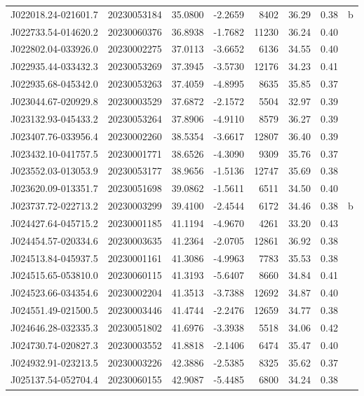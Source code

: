 \documentclass{article}
\begin{document}
\begin {longtable}{|l|l|r|r|r|r|r|l|}
 J022018.24-021601.7&  20230053184&   35.0800&   -2.2659&  8402& 36.29& 0.38&b\\%
 J022733.54-014620.2&  20230060376&   36.8938&   -1.7682& 11230& 36.24& 0.40&\\
 J022802.04-033926.0&  20230002275&   37.0113&   -3.6652&  6136& 34.55& 0.40&\\
 J022935.44-033432.3&  20230053269&   37.3945&   -3.5730& 12176& 34.23& 0.41&\\
 J022935.68-045342.0&  20230053263&   37.4059&   -4.8995&  8635& 35.85& 0.37&\\
 J023044.67-020929.8&  20230003529&   37.6872&   -2.1572&  5504& 32.97& 0.39&\\
 J023132.93-045433.2&  20230053264&   37.8906&   -4.9110&  8579& 36.27& 0.39&\\
 J023407.76-033956.4&  20230002260&   38.5354&   -3.6617& 12807& 36.40& 0.39&\\
 J023432.10-041757.5&  20230001771&   38.6526&   -4.3090&  9309& 35.76& 0.37&\\
 J023552.03-013053.9&  20230053177&   38.9656&   -1.5136& 12747& 35.69& 0.38&\\
 J023620.09-013351.7&  20230051698&   39.0862&   -1.5611&  6511& 34.50& 0.40&\\
 J023737.72-022713.2&  20230003299&   39.4100&   -2.4544&  6172& 34.46& 0.38&b\\%
 J024427.64-045715.2&  20230001185&   41.1194&   -4.9670&  4261& 33.20& 0.43&\\
 J024454.57-020334.6&  20230003635&   41.2364&   -2.0705& 12861& 36.92& 0.38&\\
 J024513.84-045937.5&  20230001161&   41.3086&   -4.9963&  7783& 35.53& 0.38&\\
 J024515.65-053810.0&  20230060115&   41.3193&   -5.6407&  8660& 34.84& 0.41&\\
 J024523.66-034354.6&  20230002204&   41.3513&   -3.7388& 12692& 34.87& 0.40&\\
 J024551.49-021500.5&  20230003446&   41.4744&   -2.2476& 12659& 34.77& 0.38&\\
 J024646.28-032335.3&  20230051802&   41.6976&   -3.3938&  5518& 34.06& 0.42&\\
 J024730.74-020827.3&  20230003552&   41.8818&   -2.1406&  6474& 35.47& 0.40&\\
 J024932.91-023213.5&  20230003226&   42.3886&   -2.5385&  8325& 35.62& 0.37&\\
 J025137.54-052704.4&  20230060155&   42.9087&   -5.4485&  6800& 34.24& 0.38&\\

\end{longtable}
\end{document}
